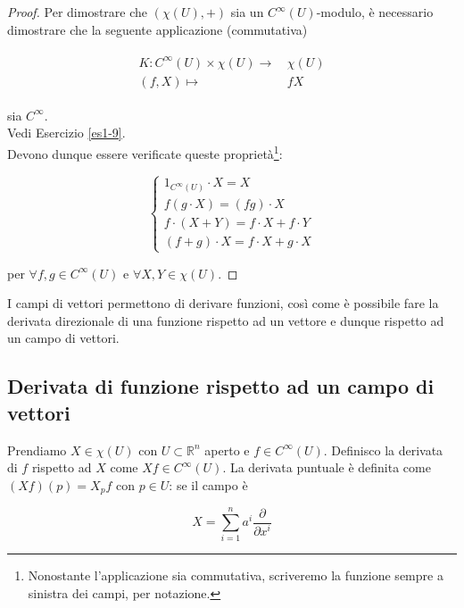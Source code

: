 \begin{proof}
	Per dimostrare che $ (\chi(U),+) $ sia un $ C^{\infty}(U) $-modulo, è necessario dimostrare che la seguente applicazione (commutativa)
	
	\begin{align}
		\begin{split}
			K : C^{\infty}(U) \times \chi(U) \to& \, \chi(U)\\
			(f,X) \mapsto& \, f X
		\end{split}
	\end{align}

	sia $ C^{\infty} $.\\
	Vedi Esercizio \ref{es1-9}.\\
	Devono dunque essere verificate queste proprietà\footnote{%
		Nonostante l'applicazione sia commutativa, scriveremo la funzione sempre a sinistra dei campi, per notazione.%
	}:
	
	\begin{equation}
		\begin{cases}
			1_{C^{\infty}(U)} \cdot X = X\\
			f (g \cdot X) = (f g) \cdot X\\
			f \cdot (X+Y) = f \cdot X + f \cdot Y\\
			(f+g) \cdot X = f \cdot X + g \cdot X
		\end{cases}
	\end{equation}

	per $ \forall f,g \in C^{\infty}(U) $ e $ \forall X,Y \in \chi(U) $.
\end{proof}

I campi di vettori permettono di derivare funzioni, così come è possibile fare la derivata direzionale di una funzione rispetto ad un vettore e dunque rispetto ad un campo di vettori.

\subsection{Derivata di funzione rispetto ad un campo di vettori} 

Prendiamo $ X \in \chi(U) $ con $ U \subset \mathbb{R}^{n} $ aperto e $ f \in C^{\infty}(U) $. Definisco la derivata di $ f $ rispetto ad $ X $ come $ X f \in C^{\infty}(U) $. La derivata puntuale è definita come $ (X f) (p) = X_{p} f $ con $ p \in U $: se il campo è

\begin{equation}
	X = \sum_{i=1}^{n} a^{i} \dfrac{\partial}{\partial x^{i}}
\end{equation}

